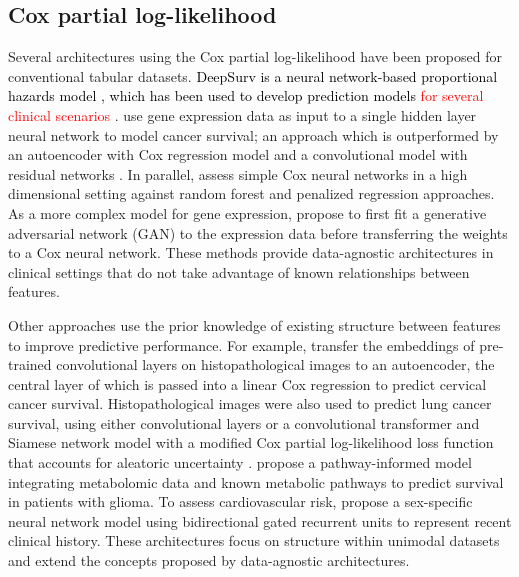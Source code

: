 \documentclass[preprint,12pt,authoryear]{elsarticle}
\begin{document}
\subsection{Cox partial log-likelihood} \label{coxFrame}

Several architectures using the Cox partial log-likelihood have been proposed for conventional tabular datasets. \textcolor{black}{DeepSurv is a neural network-based proportional hazards model \citep{katzman2018DeepSurv}, which has been used to develop prediction models} \textcolor{red}{for several clinical scenarios \citep{ds1} \citep{ds2} \citep{ds3} \citep{she2020development}}. \citet{ching2018cox} use gene expression data as input to a single hidden layer neural network to model cancer survival; an approach which is outperformed by an autoencoder with Cox regression model \citep{yin2022cox} and a convolutional model with residual networks \citep{huang2020deep}. In parallel, \citet{hao2021deep} assess simple Cox neural networks in a high dimensional setting against random forest and penalized regression approaches. As a more complex model for gene expression, \citet{meng2022novel} propose to first fit a generative adversarial network (GAN) to the expression data before transferring the weights to a Cox neural network. These methods provide data-agnostic architectures in clinical settings that do not take advantage of known relationships between features.

 Other approaches use the prior knowledge of existing structure between features to improve predictive performance. For example,
 \citet{chen2023pathological} transfer the embeddings of pre-trained convolutional layers on histopathological images to an autoencoder, the central layer of which is passed into a linear Cox regression to predict cervical cancer survival. Histopathological images were also used to predict lung cancer survival, using either convolutional layers \citep{zhu2017wsisa} or a convolutional transformer and Siamese network model with a modified Cox partial log-likelihood loss function that accounts for aleatoric uncertainty \citep{tang2023explainable}. \citet{kaynar2023pideel} propose a pathway-informed model integrating metabolomic data and known metabolic pathways to predict survival in patients with glioma. To assess cardiovascular risk, \citet{barbieri2022predicting} propose a sex-specific neural network model using bidirectional gated recurrent units to represent recent clinical history. These architectures focus on structure within unimodal datasets and extend the concepts proposed by data-agnostic architectures.
\end{document}
